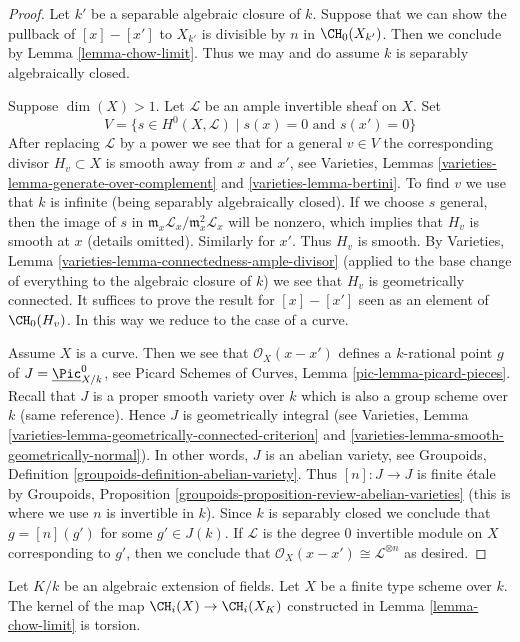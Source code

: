 \begin{proof}
Let $k'$ be a separable algebraic closure of $k$. Suppose that we can show
the pullback of $[x] - [x']$ to $X_{k'}$ is divisible by $n$ in
$\CH_0(X_{k'})$. Then we conclude by Lemma \ref{lemma-chow-limit}.
Thus we may and do assume $k$ is separably algebraically closed.

\medskip\noindent
Suppose $\dim(X) > 1$. Let $\mathcal{L}$ be an ample invertible sheaf on $X$.
Set
$$
V = \{s \in H^0(X, \mathcal{L}) \mid s(x) = 0\text{ and }s(x') = 0 \}
$$
After replacing $\mathcal{L}$ by a power we see that for
a general $v \in V$ the corresponding divisor $H_v \subset X$ is smooth
away from $x$ and $x'$, see
Varieties, Lemmas \ref{varieties-lemma-generate-over-complement} and
\ref{varieties-lemma-bertini}. To find $v$ we use that $k$ is infinite (being
separably algebraically closed).
If we choose $s$ general, then the image of $s$ in
$\mathfrak m_x\mathcal{L}_x/\mathfrak m_x^2\mathcal{L}_x$
will be nonzero, which implies that $H_v$ is smooth at $x$
(details omitted). Similarly for $x'$. Thus $H_v$ is smooth.
By Varieties, Lemma \ref{varieties-lemma-connectedness-ample-divisor}
(applied to the base change of everything
to the algebraic closure of $k$)
we see that $H_v$ is geometrically connected.
It suffices to prove the result for
$[x] - [x']$ seen as an element of $\CH_0(H_v)$.
In this way we reduce to the case of a curve.

\medskip\noindent
Assume $X$ is a curve. Then we see that $\mathcal{O}_X(x - x')$
defines a $k$-rational point $g$ of $J = \underline{\Pic}^0_{X/k}$, see
Picard Schemes of Curves, Lemma \ref{pic-lemma-picard-pieces}.
Recall that $J$ is a proper smooth variety over $k$
which is also a group scheme over $k$ (same reference).
Hence $J$ is geometrically integral
(see Varieties, Lemma \ref{varieties-lemma-geometrically-connected-criterion}
and \ref{varieties-lemma-smooth-geometrically-normal}).
In other words, $J$ is an abelian variety, see
Groupoids, Definition \ref{groupoids-definition-abelian-variety}.
Thus $[n] : J \to J$ is finite \'etale by
Groupoids, Proposition \ref{groupoids-proposition-review-abelian-varieties}
(this is where we use $n$ is invertible in $k$).
Since $k$ is separably closed we conclude that $g = [n](g')$
for some $g' \in J(k)$. If $\mathcal{L}$ is the degree $0$
invertible module on $X$ corresponding to $g'$, then we conclude
that $\mathcal{O}_X(x - x') \cong \mathcal{L}^{\otimes n}$ as desired.
\end{proof}

\begin{lemma}
\label{lemma-kernel-to-closure}
Let $K/k$ be an algebraic extension of fields.
Let $X$ be a finite type scheme over $k$.
The kernel of the map $\CH_i(X) \to \CH_i(X_K)$
constructed in Lemma \ref{lemma-chow-limit}
is torsion.
\end{lemma}

